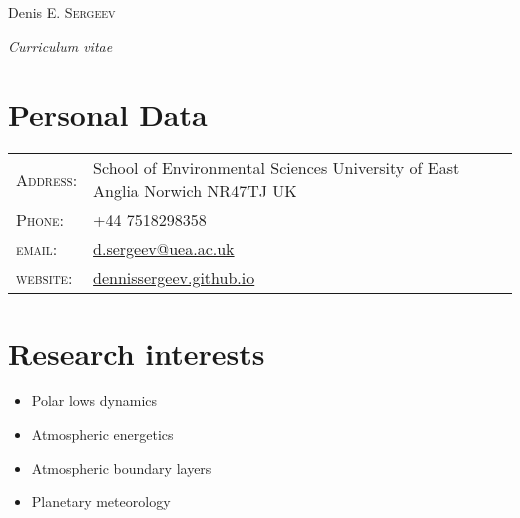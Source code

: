 \documentclass[a4paper,11pt]{article}
\newlength{\mycol}
\begin{document}
\pagestyle{empty} %
\flushleft

\par{\centering
		{\Huge Denis E. \textsc{Sergeev} \par
		 \normalsize \textit{Curriculum vitae}
		
	}\bigskip\par}

\section{Personal Data}
\renewcommand{\arraystretch}{1.2}
\begin{tabu} to 
    \textsc{Address:}   & School of Environmental Sciences \newline University of East Anglia \newline Norwich \newline NR47TJ \newline UK \\
    \textsc{Phone:}     & +44 7518298358\\
    \textsc{email:}     & \href{mailto:d.sergeev@uea.ac.uk}{d.sergeev@uea.ac.uk}\\
    \textsc{website:}     & \href{http://dennissergeev.github.io}{dennissergeev.github.io}
\end{tabu}
\renewcommand{\arraystretch}{1}

 \renewcommand{\labelitemi}{\scriptsize$\blacksquare$} 

\section{Research interests}
\begin{itemize}
 \item Polar lows dynamics
 \item Atmospheric energetics
 \item Atmospheric boundary layers
 \item Planetary meteorology
\end{itemize}
\end{document}
